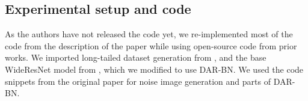 


\subsection{Experimental setup and code}


As the authors have not released the code yet, we re-implemented most of the code from the description of the paper while using open-source code from prior works. We imported long-tailed dataset generation from \citet{LDAM-DRW}, and the base WideResNet model from \citet{torchdistill}, which we modified to use DAR-BN. We used the code snippets from the original paper for noise image generation and parts of DAR-BN.

